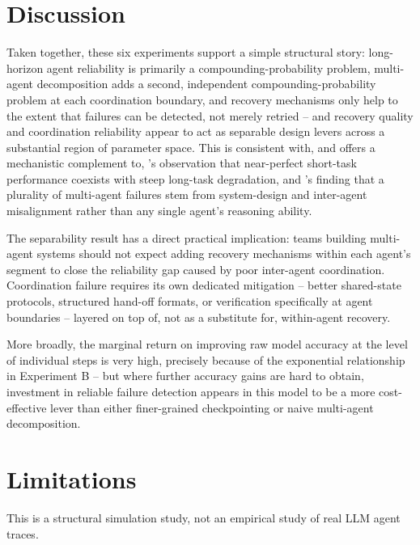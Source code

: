 \documentclass[11pt]{article}
\begin{document}
\section{Discussion}
Taken together, these six experiments support a simple structural story: long-horizon agent reliability is primarily a compounding-probability problem, multi-agent decomposition adds a second, independent compounding-probability problem at each coordination boundary, and recovery mechanisms only help to the extent that failures can be detected, not merely retried -- and recovery quality and coordination reliability appear to act as separable design levers across a substantial region of parameter space. This is consistent with, and offers a mechanistic complement to, \citet{kwa2025measuring}'s observation that near-perfect short-task performance coexists with steep long-task degradation, and \citet{cemri2025why}'s finding that a plurality of multi-agent failures stem from system-design and inter-agent misalignment rather than any single agent's reasoning ability.

The separability result has a direct practical implication: teams building multi-agent systems should not expect adding recovery mechanisms within each agent's segment to close the reliability gap caused by poor inter-agent coordination. Coordination failure requires its own dedicated mitigation -- better shared-state protocols, structured hand-off formats, or verification specifically at agent boundaries -- layered on top of, not as a substitute for, within-agent recovery.

More broadly, the marginal return on improving raw model accuracy at the level of individual steps is very high, precisely because of the exponential relationship in Experiment B -- but where further accuracy gains are hard to obtain, investment in reliable failure detection appears in this model to be a more cost-effective lever than either finer-grained checkpointing or naive multi-agent decomposition.

\section{Limitations}
This is a structural simulation study, not an empirical study of real LLM agent traces.
\end{document}
